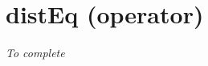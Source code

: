 \section{distEq (operator)}\label{disteq:disteqoperator}\hypertarget{disteq:disteqoperator}{}

\emph{To complete}